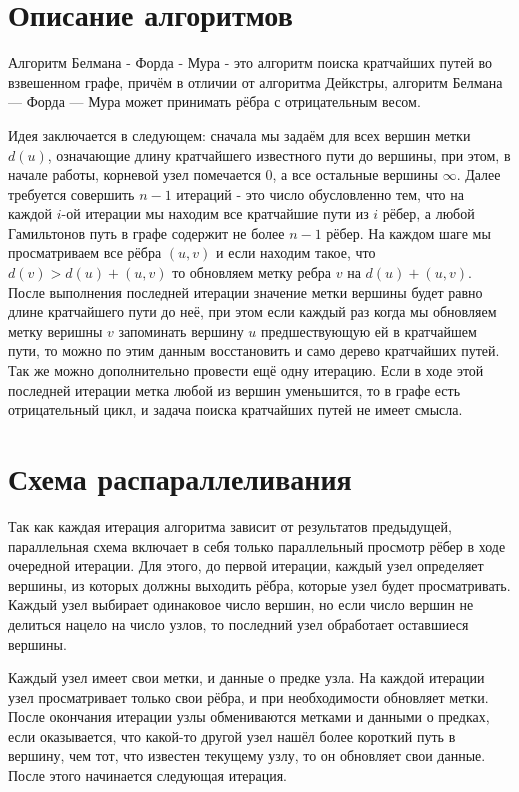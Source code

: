 \documentclass{report}
\begin{document}
\section*{Описание алгоритмов}
Алгоритм Белмана - Форда - Мура - это алгоритм поиска кратчайших путей во взвешенном графе, причём в отличии от алгоритма Дейкстры, алгоритм Белмана — Форда — Мура может принимать рёбра с отрицательным весом.
\par Идея заключается в следующем: сначала мы задаём для всех вершин метки $d(u)$, означающие длину кратчайшего известного пути до вершины, при этом, в начале работы, корневой узел помечается $0$, а все остальные вершины $\infty$. Далее требуется совершить $n-1$ итераций - это число обусловленно тем, что на каждой $i$-ой итерации мы находим все кратчайшие пути из $i$ рёбер, а любой Гамильтонов путь в графе содержит не более $n-1$ рёбер. На каждом шаге мы просматриваем все рёбра $(u,v)$ и если находим такое, что $d(v)>d(u)+(u,v)$ то обновляем метку ребра $v$ на $d(u)+(u,v)$. После выполнения последней итерации значение метки вершины будет равно длине кратчайшего пути до неё, при этом если каждый раз когда мы обновляем метку веришны $v$ запоминать вершину $u$ предшествующую ей в кратчайшем пути, то можно по этим данным восстановить и само дерево кратчайших путей. Так же можно дополнительно провести ещё одну итерацию. Если в ходе этой последней итерации метка любой из вершин уменьшится, то в графе есть отрицательный цикл, и задача поиска кратчайших путей не имеет смысла.
\newpage

\section*{Схема распараллеливания}
Так как каждая итерация алгоритма зависит от результатов предыдущей, параллельная схема включает в себя только параллельный просмотр рёбер в ходе очередной итерации. Для этого, до первой итерации, каждый узел определяет вершины, из которых должны выходить рёбра, которые узел будет просматривать. Каждый узел выбирает одинаковое число вершин, но если число вершин не делиться нацело на число узлов, то последний узел обработает оставшиеся вершины.
\par Каждый узел имеет свои метки, и данные о предке узла. На каждой итерации узел просматривает только свои рёбра, и при необходимости обновляет метки. После окончания итерации узлы обмениваются метками и данными о предках, если оказывается, что какой-то другой узел нашёл более короткий путь в вершину, чем тот, что известен текущему узлу, то он обновляет свои данные. После этого начинается следующая итерация.
\newpage
\end{document}
